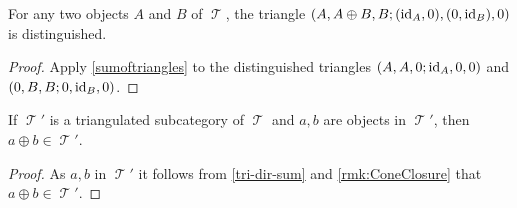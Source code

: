 \documentclass[11pt]{article}
\DeclareMathOperator{\TT}{\mathcal{T}}
\begin{document}
\begin{cor}\label{tri-dir-sum}
For any two objects $A$ and $B$ of $\TT$, the triangle $(A, A \oplus B, B; (\operatorname{id}_A,0), (0,\operatorname{id}_B),0)$ is distinguished. 
\end{cor}
\begin{proof}
Apply \autoref{sumoftriangles} to the distinguished triangles $(A,A,0; \operatorname{id}_A,0,0)$ and $(0,B,B; 0,\operatorname{id}_B,0)$.
\end{proof}

\begin{cor}\label{cor:TriSubDirSums}
If $\TT'$ is a triangulated subcategory of $\TT$ and $a,b$ are objects in $\TT'$, then $a \oplus b \in \TT'$.
\end{cor}
\begin{proof}
	As $a,b$ in $\TT'$ it follows from \autoref{tri-dir-sum} and \autoref{rmk:ConeClosure} that $a \oplus b \in \TT'$.
\end{proof}

\nocite{*}

\end{document}
